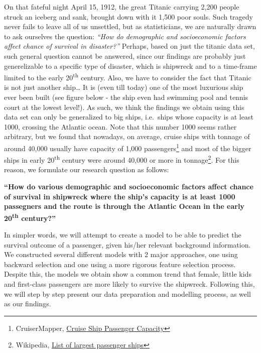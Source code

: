 \documentclass[12pt, oneside]{book}
\theoremstyle{definition}
\theoremstyle{definition}
\theoremstyle{definition}
\theoremstyle{remark}
\begin{document}
On that fateful night April 15, 1912, the great Titanic carrying 2,200
people struck an iceberg and sank, brought down with it 1,500 poor
souls. Such tragedy never fails to leave all of us unsettled, but as
statisticians, we are naturally drawn to ask ourselves the question:
\emph{``How do demographic and socioeconomic factors affect chance of
survival in disaster?''} Perhaps, based on just the titanic data set,
such general question cannot be answered, since our findings are
probably just generelizable to a specific type of disaster, which is
shipwreck and to a time-frame limited to the early
20\textsuperscript{th} century. Also, we have to consider the fact that
Titanic is not just another ship\ldots{} It is (even till today) one of
the most luxurious ship ever been built (see figure below - the ship
even had swimming pool and tennis court at the lowest level!). As such,
we think the findings we obtain using this data set can only be
generalized to big ships, i.e.~ships whose capacity is at least 1000,
crossing the Atlantic ocean. Note that this number 1000 seems rather
arbitrary, but we found that nowadays, on average, cruise ships with
tonnage of around 40,000 usually have capacity of 1,000
passengers\footnote{CruiserMapper,
  \href{http://www.cruisemapper.com/wiki/761-cruise-ship-passenger-capacity-ratings}{Cruise
  Ship Passenger Capacity}} and most of the bigger ships in early
20\textsuperscript{th} century were around 40,000 or more in
tonnage\footnote{Wikipedia,
  \href{https://en.wikipedia.org/wiki/List_of_largest_passenger_ships}{List
  of largest passenger ships}}. For this reason, we formulate our
research question as follows:

\textbf{``How do various demographic and socioeconomic factors affect
chance of survival in shipwreck where the ship's capacity is at least
1000 passegners and the route is through the Atlantic Ocean in the early
20\textsuperscript{th} century?''}

In simpler words, we will attempt to create a model to be able to
predict the survival outcome of a passenger, given his/her relevant
background information. We constructed several different models with 2
major approaches, one using backward selection and one using a more
rigorous feature selection process. Despite this, the models we obtain
show a common trend that female, little kids and first-class passengers
are more likely to survive the shipwreck. Following this, we will step
by step present our data preparation and modelling process, as well as
our findings.
\end{document}
